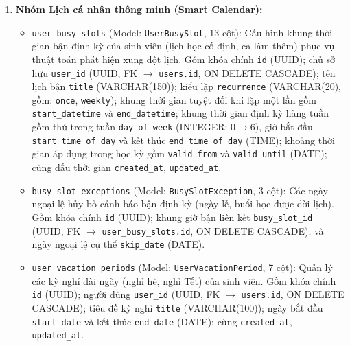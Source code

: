 \begin{enumerate}
    \item \textbf{Nhóm Lịch cá nhân thông minh (Smart Calendar):}
    \begin{itemize}
        \item \texttt{user\_busy\_slots} (Model: \texttt{UserBusySlot}, 13 cột): Cấu hình khung thời gian bận định kỳ của sinh viên (lịch học cố định, ca làm thêm) phục vụ thuật toán phát hiện xung đột lịch. Gồm khóa chính \texttt{id} (UUID); chủ sở hữu \texttt{user\_id} (UUID, FK $\rightarrow$ \texttt{users.id}, ON DELETE CASCADE); tên lịch bận \texttt{title} (VARCHAR(150)); kiểu lặp \texttt{recurrence} (VARCHAR(20), gồm: \texttt{once}, \texttt{weekly}); khung thời gian tuyệt đối khi lặp một lần gồm \texttt{start\_datetime} và \texttt{end\_datetime}; khung thời gian định kỳ hàng tuần gồm thứ trong tuần \texttt{day\_of\_week} (INTEGER: $0 \rightarrow 6$), giờ bắt đầu \texttt{start\_time\_of\_day} và kết thúc \texttt{end\_time\_of\_day} (TIME); khoảng thời gian áp dụng trong học kỳ gồm \texttt{valid\_from} và \texttt{valid\_until} (DATE); cùng dấu thời gian \texttt{created\_at}, \texttt{updated\_at}.
        \item \texttt{busy\_slot\_exceptions} (Model: \texttt{BusySlotException}, 3 cột): Các ngày ngoại lệ hủy bỏ cảnh báo bận định kỳ (ngày lễ, buổi học được dời lịch). Gồm khóa chính \texttt{id} (UUID); khung giờ bận liên kết \texttt{busy\_slot\_id} (UUID, FK $\rightarrow$ \texttt{user\_busy\_slots.id}, ON DELETE CASCADE); và ngày ngoại lệ cụ thể \texttt{skip\_date} (DATE).
        \item \texttt{user\_vacation\_periods} (Model: \texttt{UserVacationPeriod}, 7 cột): Quản lý các kỳ nghỉ dài ngày (nghỉ hè, nghỉ Tết) của sinh viên. Gồm khóa chính \texttt{id} (UUID); người dùng \texttt{user\_id} (UUID, FK $\rightarrow$ \texttt{users.id}, ON DELETE CASCADE); tiêu đề kỳ nghỉ \texttt{title} (VARCHAR(100)); ngày bắt đầu \texttt{start\_date} và kết thúc \texttt{end\_date} (DATE); cùng \texttt{created\_at}, \texttt{updated\_at}.
    \end{itemize}


\end{enumerate}
